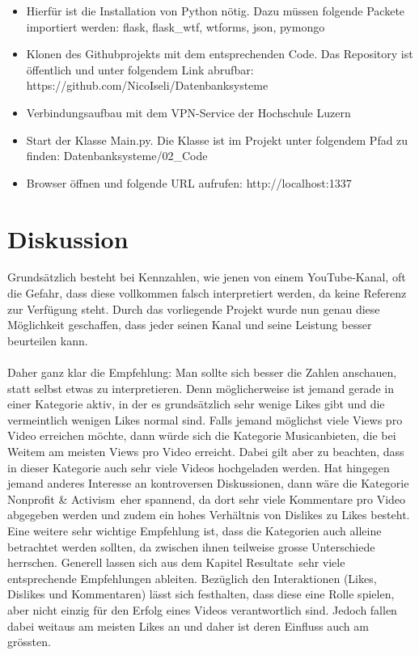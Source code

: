 \documentclass[12pt,titlepage]{article}
\begin{document}
\begin{itemize}
\item Hierfür ist die Installation von Python nötig. Dazu müssen folgende Packete importiert werden: flask, flask\_wtf, wtforms, json, pymongo
\item Klonen des Githubprojekts mit dem entsprechenden Code. Das Repository ist öffentlich und unter folgendem Link abrufbar:\\
https://github.com/NicoIseli/Datenbanksysteme
\item Verbindungsaufbau mit dem VPN-Service der Hochschule Luzern
\item Start der Klasse Main.py. Die Klasse ist im Projekt unter folgendem Pfad zu finden: Datenbanksysteme/02\_Code
\item Browser öffnen und folgende URL aufrufen: http://localhost:1337
\end{itemize} 
\newpage

\section{Diskussion}
Grundsätzlich besteht bei Kennzahlen, wie jenen von einem YouTube-Kanal, oft die Gefahr, dass diese vollkommen falsch interpretiert werden, da keine Referenz zur Verfügung steht. Durch das vorliegende Projekt wurde nun genau diese Möglichkeit geschaffen, dass jeder seinen Kanal und seine Leistung besser beurteilen kann. \\
\\
Daher ganz klar die Empfehlung: Man sollte sich besser die Zahlen anschauen, statt selbst etwas zu interpretieren. Denn möglicherweise ist jemand gerade in einer Kategorie aktiv, in der es grundsätzlich sehr wenige Likes gibt und die vermeintlich wenigen Likes normal sind. Falls jemand möglichst viele Views pro Video erreichen möchte, dann würde sich die Kategorie \glqq Music\grqq anbieten, die bei Weitem am meisten Views pro Video erreicht. Dabei gilt aber zu beachten, dass in dieser Kategorie auch sehr viele Videos hochgeladen werden. Hat hingegen jemand anderes Interesse an kontroversen Diskussionen, dann wäre die Kategorie \glqq Nonprofit \& Activism\grqq\, eher spannend, da dort sehr viele Kommentare pro Video abgegeben werden und zudem ein hohes Verhältnis von Dislikes zu Likes besteht. Eine weitere sehr wichtige Empfehlung ist, dass die Kategorien auch alleine betrachtet werden sollten, da zwischen ihnen teilweise grosse Unterschiede herrschen. Generell lassen sich aus dem Kapitel \glqq Resultate\grqq\, sehr viele entsprechende Empfehlungen ableiten. Bezüglich den Interaktionen (Likes, Dislikes und Kommentaren) lässt sich festhalten, dass diese eine Rolle spielen, aber nicht einzig für den Erfolg eines Videos verantwortlich sind. Jedoch fallen dabei weitaus am meisten Likes an und daher ist deren Einfluss auch am grössten.
\newpage
\end{document}
